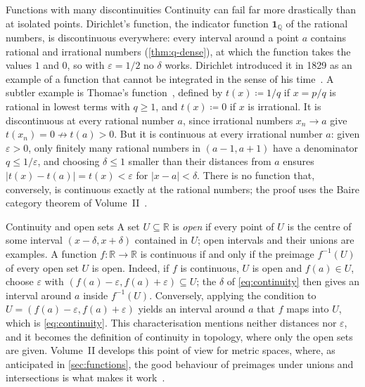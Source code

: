 \begin{note}{Functions with many discontinuities}
Continuity can fail far more drastically than at isolated points. Dirichlet's function, the indicator function $\mathbf 1_{\mathbb Q}$ of the rational numbers, is discontinuous everywhere: every interval around a point $a$ contains rational and irrational numbers (\cref{thm:q-dense}), at which the function takes the values $1$ and $0$, so with $\varepsilon=1/2$ no $\delta$ works. Dirichlet introduced it in 1829 as an example of a function that cannot be integrated in the sense of his time~\cite{dirichlet1829}. A subtler example is Thomae's function~\cite{thomae1875}, defined by $t(x)\coloneqq1/q$ if $x=p/q$ is rational in lowest terms with $q\ge1$, and $t(x)\coloneqq0$ if $x$ is irrational. It is discontinuous at every rational number $a$, since irrational numbers $x_n\to a$ give $t(x_n)=0\not\to t(a)>0$. But it is continuous at every irrational number $a$: given $\varepsilon>0$, only finitely many rational numbers in $(a-1,a+1)$ have a denominator $q\le1/\varepsilon$, and choosing $\delta\le1$ smaller than their distances from $a$ ensures $|t(x)-t(a)|=t(x)<\varepsilon$ for $|x-a|<\delta$. There is no function that, conversely, is continuous exactly at the rational numbers; the proof uses the Baire category theorem of Volume~II~\cite{abbott2015}.
\end{note}

\begin{note}{Continuity and open sets}
A set $U\subseteq\mathbb R$ is \emph{open} if every point of $U$ is the centre of some interval $(x-\delta,x+\delta)$ contained in $U$; open intervals and their unions are examples. A function $f\colon\mathbb R\to\mathbb R$ is continuous if and only if the preimage $f^{-1}(U)$ of every open set $U$ is open. Indeed, if $f$ is continuous, $U$ is open and $f(a)\in U$, choose $\varepsilon$ with $(f(a)-\varepsilon,f(a)+\varepsilon)\subseteq U$; the $\delta$ of \eqref{eq:continuity} then gives an interval around $a$ inside $f^{-1}(U)$. Conversely, applying the condition to $U=(f(a)-\varepsilon,f(a)+\varepsilon)$ yields an interval around $a$ that $f$ maps into $U$, which is \eqref{eq:continuity}. This characterisation mentions neither distances nor $\varepsilon$, and it becomes the definition of continuity in topology, where only the open sets are given. Volume~II develops this point of view for metric spaces, where, as anticipated in \cref{sec:functions}, the good behaviour of preimages under unions and intersections is what makes it work~\cite{rudin1976}.
\end{note}

